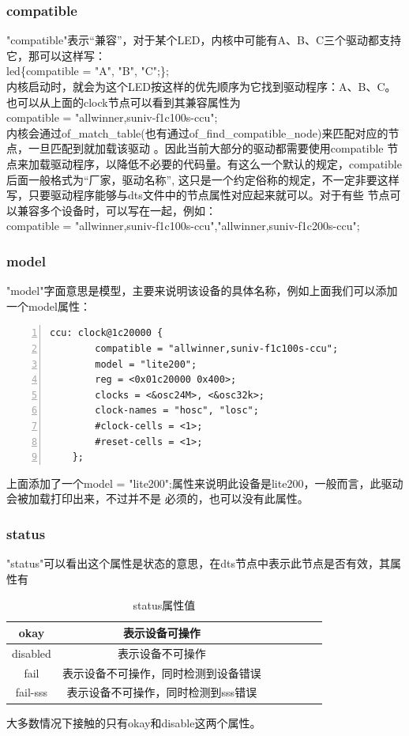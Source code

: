 \subsubsection{compatible}
"compatible"表示“兼容”，对于某个LED，内核中可能有A、B、C三个驱动都支持它，那可以这样写：\\
led\{compatible = "A", "B", "C";\};  \\
内核启动时，就会为这个LED按这样的优先顺序为它找到驱动程序：A、B、C。
也可以从上面的clock节点可以看到其兼容属性为\\
compatible = "allwinner,suniv-f1c100s-ccu";\\
内核会通过of\_match\_table(也有通过of\_find\_compatible\_node)来匹配对应的节点，一旦匹配到就加载该驱动
。因此当前大部分的驱动都需要使用compatible
节点来加载驱动程序，以降低不必要的代码量。有这么一个默认的规定，compatible后面一般格式为“厂家，驱动名称”,
这只是一个约定俗称的规定，不一定非要这样写，只要驱动程序能够与dts文件中的节点属性对应起来就可以。对于有些
节点可以兼容多个设备时，可以写在一起，例如：\\
compatible = "allwinner,suniv-f1c100s-ccu","allwinner,suniv-f1c200s-ccu";

\subsubsection{model}
"model"字面意思是模型，主要来说明该设备的具体名称，例如上面我们可以添加一个model属性：\\
\begin{lstlisting}[language={[ANSI]C},numbers=left,numberstyle=\tiny,frame=shadowbox,
	rulesepcolor=\color{red!20!green!20!blue!20},
	keywordstyle=\color{blue!70!black},
	commentstyle=\color{blue!90!},
	basicstyle=\ttfamily]
	ccu: clock@1c20000 {
		compatible = "allwinner,suniv-f1c100s-ccu";
		model = "lite200";
		reg = <0x01c20000 0x400>;
		clocks = <&osc24M>, <&osc32k>;
		clock-names = "hosc", "losc";
		#clock-cells = <1>;
		#reset-cells = <1>;
	};
\end{lstlisting}
上面添加了一个model = "lite200";属性来说明此设备是lite200，一般而言，此驱动会被加载打印出来，不过并不是
必须的，也可以没有此属性。

\subsubsection{status}
"status"可以看出这个属性是状态的意思，在dts节点中表示此节点是否有效，其属性有
\begin{table}[htbp]
	\centering
	\caption{status属性值}
	\begin{tabular}{ccccccc}
	\hline
	okay & 表示设备可操作 \\
	\hline
	disabled & 表示设备不可操作 \\
	\hline
	fail & 表示设备不可操作，同时检测到设备错误   \\
	\hline
	fail-sss & 表示设备不可操作，同时检测到sss错误  \\
	\hline
\end{tabular}
\end{table}
大多数情况下接触的只有okay和disable这两个属性。

